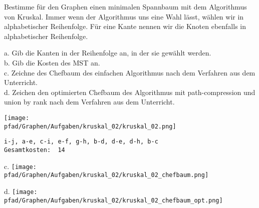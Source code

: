 ﻿\question[6]
Bestimme für den Graphen einen minimalen Spannbaum mit dem Algorithmus von Kruskal. Immer wenn der Algorithmus uns eine
Wahl lässt, wählen wir in alphabetischer Reihenfolge. Für eine Kante nennen wir die Knoten ebenfalls
in alphabetischer Reihenfolge.

a. Gib die Kanten in der Reihenfolge an, in der sie gewählt werden.  \\
b. Gib die Kosten des MST an. \\
c. Zeichne des Chefbaum des einfachen Algorithmus nach dem Verfahren aus dem Unterricht. \\
d. Zeichen den optimierten Chefbaum des Algorithmus mit path-compression und union by rank
nach dem Verfahren aus dem Unterricht.

\texttt{[image: \\pfad/Graphen/Aufgaben/kruskal\_02/kruskal\_02.png]}
\begin{solutionbox}{9cm}
\begin{lstlisting}
i-j, a-e, c-i, e-f, g-h, b-d, d-e, d-h, b-c
Gesamtkosten:  14
\end{lstlisting}
c. \texttt{[image: \\pfad/Graphen/Aufgaben/kruskal\_02/kruskal\_02\_chefbaum.png]}

d. \texttt{[image: \\pfad/Graphen/Aufgaben/kruskal\_02/kruskal\_02\_chefbaum\_opt.png]}
\end{solutionbox}
